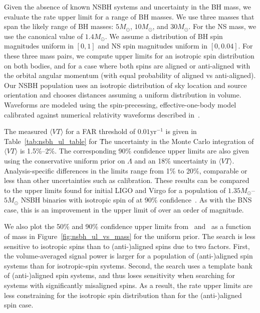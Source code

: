 Given the absence of known \ac{NSBH} systems and uncertainty in the \ac{BH} mass, we evaluate the
rate upper limit for a range of \ac{BH} masses. We use three masses that span the likely
range of \ac{BH} masses: $5M_\odot$, $10M_\odot$, and $30M_\odot$. For the \ac{NS} mass,
we use the canonical value of $1.4M_\odot$. We assume a distribution of \ac{BH} spin magnitudes
uniform in $[0,1]$ and \ac{NS} spin magnitudes uniform in $[0, 0.04]$.
For these three mass pairs, we compute upper limits for an isotropic spin distribution
on both bodies, and for a case where both spins are aligned or anti-aligned with the orbital angular momentum
(with equal probability of aligned vs anti-aligned).
Our NSBH population uses an isotropic distribution of sky location and source orientation and chooses
distances assuming a uniform distribution in volume. Waveforms are modeled
using the spin-precessing, effective-one-body model calibrated against numerical relativity
waveforms described in~\citep{Taracchini:2013rva,babak2016validating}.

The measured $\langle VT \rangle$ for a FAR threshold of $0.01 \mathrm{yr}^{-1}$ is given in Table~\ref{tab:nsbh_ul_table}
for \pycbc\. The uncertainty in the Monte Carlo integration of $\langle VT \rangle$ is 1.5\%--2\%. The corresponding 
90\% confidence upper limits are also given using the conservative 
uniform prior on $\Lambda$ and an 18\% uncertainty in $\langle VT
\rangle$. Analysis-specific differences in the limits range from 1\% to 20\%,
comparable or less than other uncertainties such as calibration.  
These results can be compared to the upper limits found for initial \ac{LIGO} and Virgo
for a population of $1.35M_\odot$--$5M_\odot$ \ac{NSBH} binaries with isotropic spin of
\SSixNSBHULFiveSpin at 90\% confidence~\citep{Colaboration:2011np}.
As with the \ac{BNS} case, this is an improvement in the upper limit of over an order of magnitude.

We also plot the 50\% and 90\% confidence upper limits from \pycbc\ and \gstlal\ as a function of mass in 
Figure~\ref{fig:nsbh_ul_vs_mass} for the uniform prior. The search is
less sensitive to isotropic spins than to (anti-)aligned spins due to two factors.
First, the volume-averaged signal
power is larger for a population of (anti-)aligned spin systems than for isotropic-spin systems.
Second, the search uses a template bank of (anti-)aligned spin systems, and thus loses sensitivity
when searching for systems with significantly misaligned spins.
As a result, the rate upper limits are less constraining
for the isotropic spin distribution than for the (anti-)aligned spin case.

